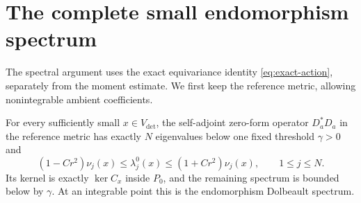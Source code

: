 \section{The complete small endomorphism spectrum}\label{sec:spectrum}

The spectral argument uses the exact equivariance identity
\eqref{eq:exact-action}, separately from the moment estimate.
We first keep the reference metric, allowing nonintegrable ambient
coefficients.

\begin{proposition}\label{prop:reference-spectrum}
For every sufficiently small $x\in V_{\det}$, the self-adjoint
zero-form operator $D_a^*D_a$ in the reference metric has exactly $N$
eigenvalues below one fixed threshold $\gamma>0$ and
\begin{equation}\label{eq:reference-spectrum}
 (1-Cr^2)\nu_j(x)\le\lambda_j^0(x)\le
               (1+Cr^2)\nu_j(x),\qquad 1\le j\le N.
\end{equation}
Its kernel is exactly $\ker C_x$ inside $P_0$, and the remaining
spectrum is bounded below by $\gamma$. At an integrable point this
is the endomorphism Dolbeault spectrum.
\end{proposition}

